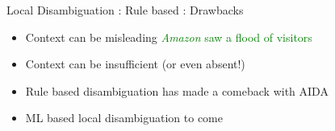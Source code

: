 \begin{frame}{Local Disambiguation : Rule based : Drawbacks}
\begin{itemize}
 \item Context can be misleading \bigskip
 \textcolor{green}{\emph{Amazon} saw a flood of visitors} \bigskip
 \item Context can be insufficient (or even absent!) \bigskip
 \item Rule based disambiguation has made a comeback with AIDA \bigskip
 \item ML based local disambiguation to come
 
 
\end{itemize}

 
\end{frame}